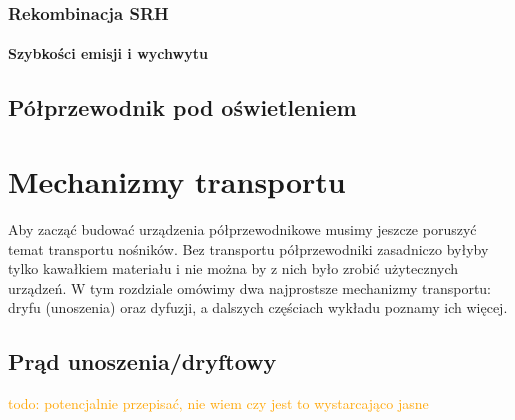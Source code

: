         \subsubsection{Rekombinacja SRH} \label{sec: SRH}
        
            \paragraph{Szybkości emisji i wychwytu}

    \subsection{Półprzewodnik pod oświetleniem} \label{sec: iluminated semiconductor}

\section{Mechanizmy transportu}
    Aby zacząć budować urządzenia półprzewodnikowe musimy jeszcze poruszyć temat transportu nośników. Bez transportu półprzewodniki zasadniczo byłyby tylko kawałkiem materiału i nie można by z nich było zrobić użytecznych urządzeń.
    W tym rozdziale omówimy dwa najprostsze mechanizmy transportu: dryfu (unoszenia) oraz dyfuzji, a dalszych częściach wykładu poznamy ich więcej.
    \subsection{Prąd unoszenia/dryftowy}
        \textcolor{orange}{todo: potencjalnie przepisać, nie wiem czy jest to wystarcająco jasne }

